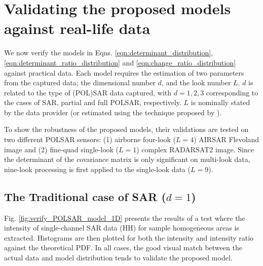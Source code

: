 \documentclass[]{tRSL2e}
\begin{document}

\section{Validating the proposed models against real-life data}
\label{sec:polsar_models_validation}

We now verify the models in Eqns. \ref{eqn:determinant_distribution}, \ref{eqn:determinant_ratio_distribution} and \ref{eqn:change_ratio_distribution} against practical data.
Each model requires the estimation of two parameters from the captured data; 
the dimensional number $d$, and  the look number $L$.
$d$ is related to the type of (POL)SAR data captured,
  with $d=1,2,3$ corresponding to the cases of SAR, partial and full POLSAR, respectively.
$L$ is nominally stated by the data provider (or estimated using the technique proposed by \citep{Anfinsen_2009_TGRS_3795}).

To show the robustness of the proposed models, 
  their validations are tested on two different POLSAR sensors: (1) airborne four-look ($L=4$) AIRSAR Flevoland image and (2)
fine-quad single-look ($L=1$) complex RADARSAT2 image.
Since the determinant of the covariance matrix is only significant on multi-look data,
  nine-look processing is first applied to the single-look data ($L=9$).

\subsection{The Traditional case of SAR ($d=1$)}

Fig. \ref{fig:verify_POLSAR_model_1D} presents the results of a test where the intensity of single-channel SAR data (HH) for sample homogeneous areas is extracted.
Histograms are then plotted for both the intensity and intensity ratio %
against the theoretical PDF.
In all cases, the good visual match between the actual data and model distribution tends to validate the proposed model. %
\end{document}
